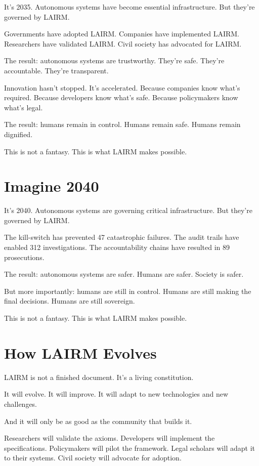 \documentclass[12pt,a4paper,twoside,openright]{book}
\begin{document}
It's 2035. Autonomous systems have become essential infrastructure. But they're governed by LAIRM.

Governments have adopted LAIRM. Companies have implemented LAIRM. Researchers have validated LAIRM. Civil society has advocated for LAIRM.

The result: autonomous systems are trustworthy. They're safe. They're accountable. They're transparent.

Innovation hasn't stopped. It's accelerated. Because companies know what's required. Because developers know what's safe. Because policymakers know what's legal.

The result: humans remain in control. Humans remain safe. Humans remain dignified.

This is not a fantasy. This is what LAIRM makes possible.

\section*{Imagine 2040}

It's 2040. Autonomous systems are governing critical infrastructure. But they're governed by LAIRM.

The kill-switch has prevented 47 catastrophic failures. The audit trails have enabled 312 investigations. The accountability chains have resulted in 89 prosecutions.

The result: autonomous systems are safer. Humans are safer. Society is safer.

But more importantly: humans are still in control. Humans are still making the final decisions. Humans are still sovereign.

This is not a fantasy. This is what LAIRM makes possible.

\section*{How LAIRM Evolves}

LAIRM is not a finished document. It's a living constitution.

It will evolve. It will improve. It will adapt to new technologies and new challenges.

And it will only be as good as the community that builds it.

Researchers will validate the axioms. Developers will implement the specifications. Policymakers will pilot the framework. Legal scholars will adapt it to their systems. Civil society will advocate for adoption.
\end{document}
